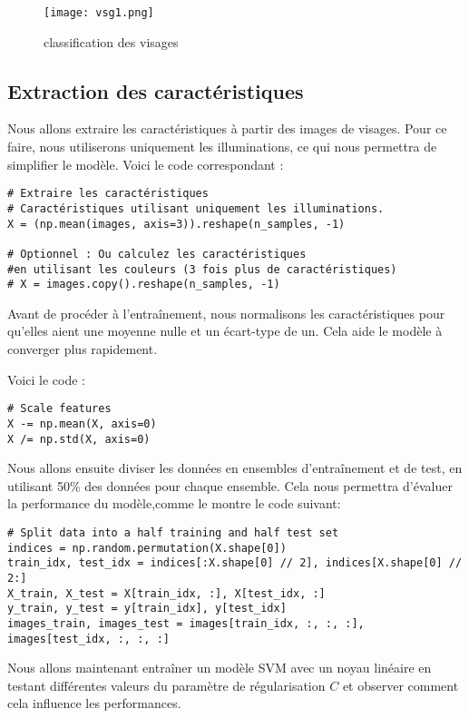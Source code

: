 \documentclass{article}
\begin{document}
\begin{itemize}
\begin{figure}[H]
    \centering
    \begin{minipage}{0.9\textwidth}
        \centering
        \texttt{[image: vsg1.png]}
        \caption{classification des visages}
    \end{minipage}
    \end{figure}

\subsection{Extraction des caractéristiques}

Nous allons extraire les caractéristiques à partir des images de visages.
Pour ce faire, nous utiliserons uniquement les illuminations, ce qui nous 
permettra de simplifier le modèle. Voici le code correspondant :

\begin{verbatim}
# Extraire les caractéristiques
# Caractéristiques utilisant uniquement les illuminations.
X = (np.mean(images, axis=3)).reshape(n_samples, -1)

# Optionnel : Ou calculez les caractéristiques 
#en utilisant les couleurs (3 fois plus de caractéristiques)
# X = images.copy().reshape(n_samples, -1)
\end{verbatim}
Avant de procéder à l'entraînement, nous normalisons les caractéristiques
pour qu'elles aient une moyenne nulle et un écart-type de un. Cela aide 
le modèle à converger plus rapidement.

Voici le code :

\begin{verbatim}
# Scale features
X -= np.mean(X, axis=0)
X /= np.std(X, axis=0)
\end{verbatim}


Nous allons ensuite diviser les données en ensembles d'entraînement et de 
test, en utilisant 50\% des données pour chaque ensemble. Cela nous 
permettra d'évaluer la performance du modèle,comme le montre le code
suivant:

\begin{verbatim}
# Split data into a half training and half test set
indices = np.random.permutation(X.shape[0])
train_idx, test_idx = indices[:X.shape[0] // 2], indices[X.shape[0] // 2:]
X_train, X_test = X[train_idx, :], X[test_idx, :]
y_train, y_test = y[train_idx], y[test_idx]
images_train, images_test = images[train_idx, :, :, :], images[test_idx, :, :, :]
\end{verbatim}
Nous allons maintenant entraîner un modèle SVM avec un noyau linéaire en 
testant différentes valeurs du paramètre de régularisation \( C \) et 
observer comment cela influence les performances. 


\end{itemize}
\end{document}
